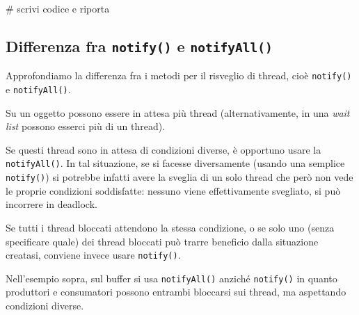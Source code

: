 \documentclass[a4paper,11pt]{article}
\begin{document}
# scrivi codice e riporta

\subsection{Differenza fra \lstinline|notify()| e \lstinline|notifyAll()|}
Approfondiamo la differenza fra i metodi per il risveglio di thread, cioè \lstinline|notify()| e \lstinline|notifyAll()|.

Su un oggetto possono essere in attesa più thread (alternativamente, in una \textit{wait list} possono esserci più di un thread).

Se questi thread sono in attesa di condizioni diverse, è opportuno usare la \lstinline|notifyAll()|.
In tal situazione, se si facesse diversamente (usando una semplice \lstinline|notify()|) si potrebbe infatti avere la sveglia di un solo thread che però non vede le proprie condizioni soddisfatte: nessuno viene effettivamente svegliato, si può incorrere in deadlock.

Se tutti i thread bloccati attendono la stessa condizione, o se solo uno (senza specificare quale) dei thread bloccati può trarre beneficio dalla situazione creatasi, conviene invece usare \lstinline|notify()|.

Nell'esempio sopra, sul buffer si usa \lstinline|notifyAll()| anziché \lstinline|notify()| in quanto produttori e consumatori possono entrambi bloccarsi sui thread, ma aspettando condizioni diverse.
\end{document}
